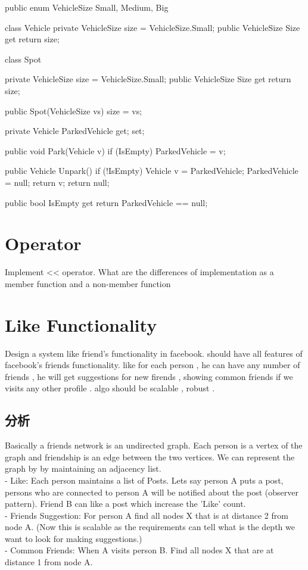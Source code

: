 \begin{Code}
	public enum VehicleSize { Small, Medium, Big }

	class Vehicle {
		private VehicleSize size = VehicleSize.Small;
		public VehicleSize Size {
			get { return size; }
		}
	}
	
	class Spot {
		private VehicleSize size = VehicleSize.Small;
		public VehicleSize Size{
			get { return size; }
		}
		
		public Spot(VehicleSize vs) {
			size = vs;
		}
		
		private Vehicle ParkedVehicle { get; set; }
		
		public void Park(Vehicle v) {
			if (IsEmpty){
				ParkedVehicle = v;
			}
		}
		
		public Vehicle Unpark() {
			if (!IsEmpty) {
				Vehicle v = ParkedVehicle;
				ParkedVehicle = null;
				return v;
			}
			return null;
		}
		
		public bool IsEmpty {
			get { return ParkedVehicle == null; }
		}
	}
\end{Code}

\section{Operator}
Implement << operator. What are the differences of implementation as a member function and a non-member function

\section{Like Functionality}
Design a system like friend's functionality in facebook. should have all features of facebook's friends functionality. like for each person , he can have any number of friends ,
he will get suggestions for new firends , showing common friends if we visits any other profile . algo should be scalable , robust .

\subsection{分析}
Basically a friends network is an undirected graph. Each person is a vertex of the graph and friendship is an edge between the two vertices. We can represent the graph by by
maintaining an adjacency list. \\
- Like: Each person maintains a list of Posts. Lets say person A puts a post, persons who are connected to person A will be notified about the post (observer pattern). Friend B
can like a post which increase the 'Like' count. \\
- Friends Suggestion: For person A find all nodes X that is at distance 2 from node A. (Now this is scalable as the requirements can tell what is the depth we want to look for
making suggestions.) \\
- Common Friends: When A visits person B. Find all nodes X that are at distance 1 from node A.


